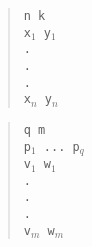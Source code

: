 \documentclass[11pt, a4paper, twoside]{article}
\begin{document}
\begin{minipage}[t]{0.5\textwidth}
  \setlength{\leftmargini}{6.5em}
  \begin{quote}
  \texttt{n k}\\
  \texttt{x$_{1}$ y$_{1}$}\\
  \texttt{.}\\
  \texttt{.}\\
  \texttt{.}\\
  \texttt{x$_{n}$ y$_{n}$}
  \end{quote}
\end{minipage}%
\begin{minipage}[t]{0.5\textwidth}
  \setlength{\leftmargini}{6.5em}
  \begin{quote}
  \texttt{q m}\\
  \texttt{p$_{1}$ ... p$_{q}$}\\
  \texttt{v$_{1}$ w$_{1}$}\\
  \texttt{.}\\
  \texttt{.}\\
  \texttt{.}\\
  \texttt{v$_{m}$ w$_{m}$}
  \end{quote}
\end{minipage}
\end{document}
